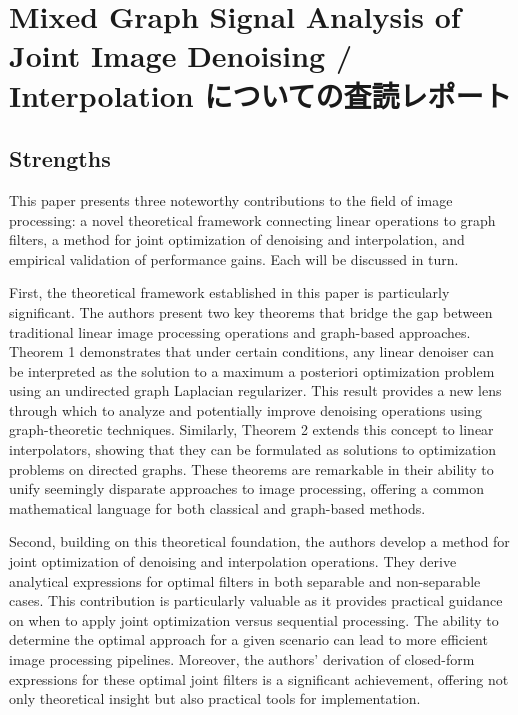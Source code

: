 \section{ {Mixed Graph Signal Analysis of Joint Image Denoising / Interpolation \cite{10445943}} についての査読レポート}

\subsection{Strengths}

This paper presents three noteworthy contributions to the field of image processing: a novel theoretical framework connecting linear operations to graph filters, a method for joint optimization of denoising and interpolation, and empirical validation of performance gains. Each will be discussed in turn.

First, the theoretical framework established in this paper is particularly significant. The authors present two key theorems that bridge the gap between traditional linear image processing operations and graph-based approaches. Theorem 1 demonstrates that under certain conditions, any linear denoiser can be interpreted as the solution to a maximum a posteriori optimization problem using an undirected graph Laplacian regularizer. This result provides a new lens through which to analyze and potentially improve denoising operations using graph-theoretic techniques. Similarly, Theorem 2 extends this concept to linear interpolators, showing that they can be formulated as solutions to optimization problems on directed graphs. These theorems are remarkable in their ability to unify seemingly disparate approaches to image processing, offering a common mathematical language for both classical and graph-based methods.

Second, building on this theoretical foundation, the authors develop a method for joint optimization of denoising and interpolation operations. They derive analytical expressions for optimal filters in both separable and non-separable cases. This contribution is particularly valuable as it provides practical guidance on when to apply joint optimization versus sequential processing. The ability to determine the optimal approach for a given scenario can lead to more efficient image processing pipelines. Moreover, the authors' derivation of closed-form expressions for these optimal joint filters is a significant achievement, offering not only theoretical insight but also practical tools for implementation.

